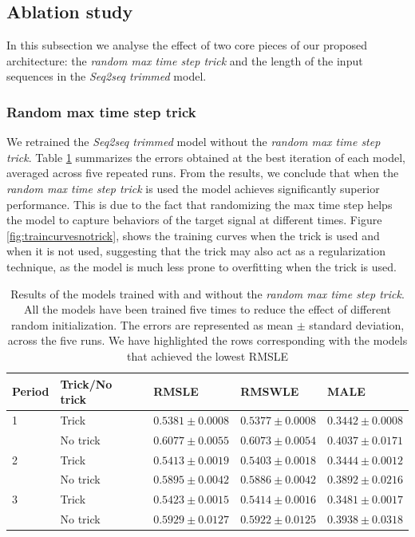 \subsection{Ablation study}
In this subsection we analyse the effect of two core pieces of our proposed architecture: the \textit{random max time step trick} and the length of the  input sequences in the \textit{Seq2seq trimmed} model.

\subsubsection{Random max time step trick}
We retrained the \textit{Seq2seq trimmed} model without the \textit{random max time step trick}. Table \ref{tab:salesforecast_results_notrick} summarizes the errors obtained at the best iteration of each model, averaged across five repeated runs. From the results, we conclude that when the \textit{random max time step trick} is used the model achieves significantly superior performance. This is due to the fact that randomizing the max time step helps the model to capture behaviors of the target signal at different times. Figure \ref{fig:traincurvesnotrick}, shows the training curves when the trick is used and when it is not used, suggesting that the trick may also act as a regularization technique, as the model is much less prone to overfitting when the trick is used.

	\begin{table}[h]
	\footnotesize
	\caption{Results of the models trained with and without the \textit{random max time step trick}. All the models have been trained five times to reduce the effect of different random initialization. The errors are represented as mean $\pm$ standard deviation, across the five runs. We have highlighted the rows corresponding with the models that achieved the lowest RMSLE}
	\label{tab:salesforecast_results_notrick}
	\centering
	\begin{tabular}{lllll}
		\hline
		Period & Trick/No trick             & RMSLE                 & RMSWLE                & MALE                  \\ \hline
		1 & Trick   & $ \mathbf{0.5381 \pm 0.0008} $ & $ \mathbf{0.5377 \pm 0.0008} $ & $ \mathbf{0.3442 \pm 0.0008} $ \\
		& No trick & $ 0.6077 \pm 0.0055 $  &  $ 0.6073 \pm 0.0054 $  &  $ 0.4037 \pm 0.0171 $ \\
		\hline
		2 & Trick  & $ \mathbf{0.5413 \pm 0.0019} $ & $ \mathbf{0.5403 \pm 0.0018} $ & $ \mathbf{0.3444 \pm 0.0012} $ \\
		& No trick & $ 0.5895 \pm 0.0042 $  &  $ 0.5886 \pm 0.0042 $  &  $ 0.3892 \pm 0.0216 $ \\
		\hline
		3 & Trick  & $ \mathbf{0.5423 \pm 0.0015} $ & $ \mathbf{0.5414 \pm 0.0016} $ & $ \mathbf{0.3481 \pm 0.0017} $ \\
		& No trick & $ 0.5929 \pm 0.0127 $  &  $ 0.5922 \pm 0.0125 $  &  $ 0.3938 \pm 0.0318 $ \\
		\hline
	\end{tabular}
\end{table}

